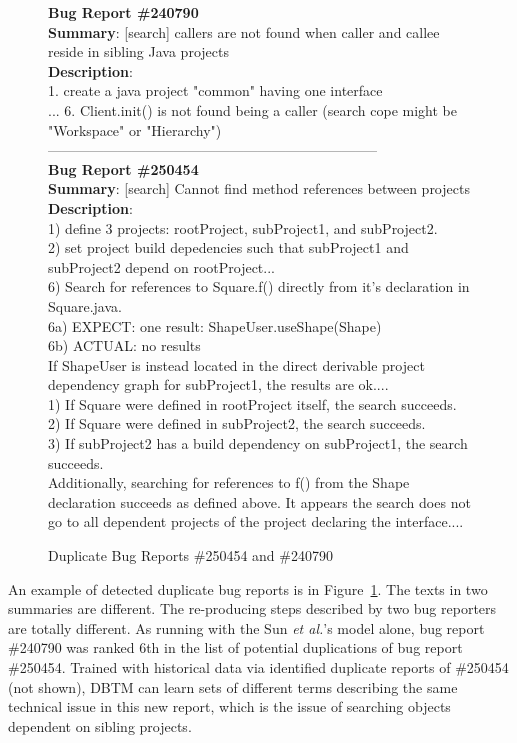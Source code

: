 \begin{figure}[t]
\small
\textbf{Bug Report \#240790}\\
\textbf{Summary}: [search] callers are not found when caller and callee reside in sibling Java projects\\
\textbf{Description}:\\
	1. create a java project "common" having one interface\\...
	6. Client.init() is not found being a caller (search cope might be
	"Workspace" or "Hierarchy")\\
-----------------------------------------------------------------------\\
\textbf{Bug Report \#250454}\\
\textbf{Summary}:   [search] Cannot find method references between projects\\
\textbf{Description}:\\
	1) define 3 projects: rootProject, subProject1, and subProject2.\\
	2) set project build depedencies such that subProject1 and subProject2 depend
	on rootProject...\\
	6) Search for references to Square.f() directly from it's declaration in
	Square.java.\\
			6a) EXPECT: one result: ShapeUser.useShape(Shape)\\
			6b) ACTUAL: no results\\
	If ShapeUser is instead located in the direct derivable project dependency
	graph for subProject1, the results are ok....\\
			1) If Square were defined in rootProject itself, the search succeeds.\\
			2) If Square were defined in subProject2, the search succeeds. \\
			3) If subProject2 has a build dependency on subProject1, the search
	succeeds.\\

	Additionally, searching for references to f() from the Shape declaration
	succeeds as defined above.  It appears the search does not go to all dependent
	projects of the project declaring the interface....\\
\caption{Duplicate Bug Reports \#250454 and \#240790}
\label{bugreport250454}
\end{figure}

\vspace{0.04in}
 An example of detected duplicate bug reports 
is in Figure~\ref{bugreport250454}. The texts in two summaries are
different. The re-producing steps described by two bug reporters are
totally different. As running with the Sun {\em et al.}'s model alone, bug
report \#240790 was ranked 6th in the list of potential duplications
of bug report \#250454. Trained with historical data via identified
duplicate reports of \#250454 (not shown), DBTM can learn sets of
different terms describing the same technical issue in this new
report, which is the issue of searching objects dependent on sibling
projects.

